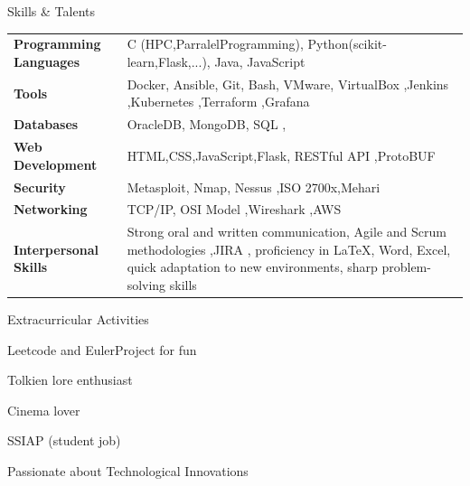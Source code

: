 \documentclass{resume}
\begin{document}
\begin{rSection}{Skills \& Talents}
    \vspace{-0.25em}
    \begin{tabularx}{\textwidth}{ @{} >{\bfseries}l @{\hspace{3ex}} X @{} }
    Programming Languages & C (HPC,ParralelProgramming), Python(scikit-learn,Flask,...), Java, JavaScript \\
    
    Tools & Docker, Ansible, Git, Bash, VMware, VirtualBox ,Jenkins ,Kubernetes ,Terraform ,Grafana\\
    
    Databases & OracleDB, MongoDB, SQL ,\\
    
    Web Development & HTML,CSS,JavaScript,Flask, RESTful API ,ProtoBUF \\
    
    Security & Metasploit, Nmap, Nessus ,ISO 2700x,Mehari\\
    
    Networking & TCP/IP, OSI Model ,Wireshark ,AWS\\
    
    Interpersonal Skills & Strong oral and written communication, Agile and Scrum methodologies ,JIRA , proficiency in LaTeX, Word, Excel, quick adaptation to new environments, sharp problem-solving skills \\
    
    \end{tabularx}
\end{rSection}
\vspace{-0.75em}

\begin{rSection}{Extracurricular Activities} 
    \vspace{-0.25em}
    \begin{enumerate*}
        \item Leetcode and EulerProject for fun
        \item Tolkien lore enthusiast
        \item Cinema lover
        \item SSIAP (student job)
        \item Passionate about Technological Innovations
    \end{enumerate*}
\end{rSection}
\end{document}
